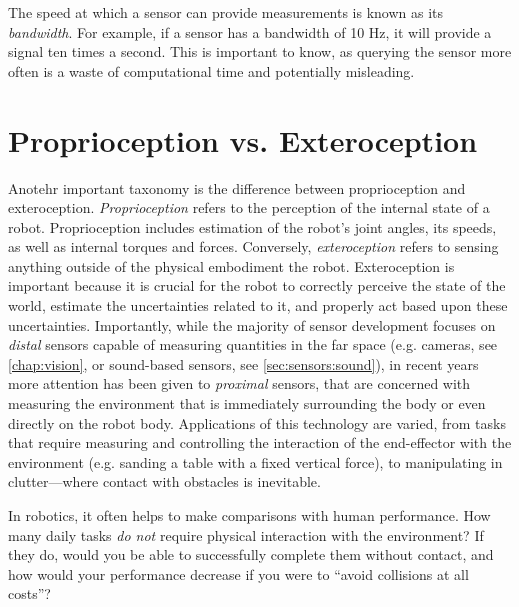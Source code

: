 The speed at which a sensor can provide measurements is known as its  \textsl{bandwidth}. For example, if a sensor has a bandwidth of 10 Hz, it will provide a signal ten times a second. This is important to know, as querying the sensor more often is a waste of computational time and potentially misleading.


\section{Proprioception vs. Exteroception}
\label{sec:sensors:proprioception}

Anotehr important taxonomy is the difference between proprioception and exteroception.
\textsl{Proprioception} refers to the perception of the internal state of a robot.
Proprioception includes estimation of the robot's joint angles, its speeds, as well as internal torques and forces.
%
%
\label{sec:sensors:interaction}
%
Conversely, \textsl{exteroception} refers to sensing anything outside of the physical embodiment the robot. Exteroception is important because it is crucial for the robot to correctly perceive the state of the world, estimate the uncertainties related to it, and properly act based upon these uncertainties.
Importantly, while the majority of sensor development focuses on \textsl{distal} sensors capable of measuring quantities in the far space (e.g. cameras, see \cref{chap:vision}, or sound-based sensors, see \cref{sec:sensors:sound}), in recent years more attention has been given to \textsl{proximal} sensors, that are concerned with measuring the environment that is immediately surrounding the body or even directly on the robot body.
Applications of this technology are varied, from tasks that require measuring and controlling the interaction of the end-effector with the environment (e.g. sanding a table with a fixed vertical force), to manipulating in clutter---where contact with obstacles is inevitable.

\begin{mdframed}
In robotics, it often helps to make comparisons with human performance.
How many daily tasks \textsl{do not} require physical interaction with the environment?
If they do, would you be able to successfully complete them without contact, and how would your performance decrease if you were to ``avoid collisions at all costs''?
\end{mdframed}

